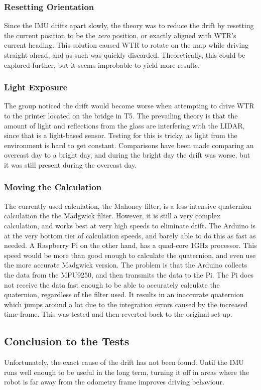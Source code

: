 \subsubsection{Resetting Orientation}
\label{subs::reset}
Since the IMU drifts apart slowly, the theory was to reduce the drift by resetting the current position to be the \textit{zero} position, or exactly aligned with WTR's current heading.
This solution caused WTR to rotate on the map while driving straight ahead, and as such was quickly discarded.
Theoretically, this could be explored further, but it seems improbable to yield more results.

\subsubsection{Light Exposure}
\label{subs::light}
The group noticed the drift would become worse when attempting to drive WTR to the printer located on the bridge in T5.
The prevailing theory is that the amount of light and reflections from the glass are interfering with the LIDAR, since that is a light-based sensor.
Testing for this is tricky, as light from the environment is hard to get constant.
Comparisons have been made comparing an overcast day to a bright day, and during the bright day the drift was worse, but it was still present during the overcast day.

\subsubsection{Moving the Calculation}
The currently used calculation, the Mahoney filter, is a less intensive quaternion calculation the the Madgwick filter.
However, it is still a very complex calculation, and works best at very high speeds to eliminate drift.
The Arduino is at the very bottom tier of calculation speeds, and barely able to do this as fast as needed.
A Raspberry Pi on the other hand, has a quad-core 1GHz processor.
This speed would be more than good enough to calculate the quaternion, and even use the more accurate Madgwick version.
The problem is that the Arduino collects the data from the MPU9250, and then transmits the data to the Pi.
The Pi does not receive the data fast enough to be able to accurately calculate the quaternion, regardless of the filter used.
It results in an inaccurate quaternion which jumps around a lot due to the integration errors caused by the increased time-frame.
This was tested and then reverted back to the original set-up.

\subsection{Conclusion to the Tests}
Unfortunately, the exact cause of the drift has not been found.
Until the IMU runs well enough to be useful in the long term, turning it off in areas where the robot is far away from the odometry frame improves driving behaviour.

\newpage